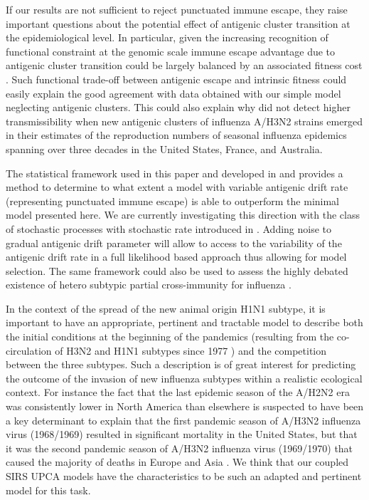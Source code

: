 If our results are not sufficient to reject punctuated immune escape,
they raise important questions about the potential effect of antigenic
cluster transition at the epidemiological level. In particular, given
the increasing recognition of functional constraint at the genomic
scale \citep{Rambaut2008, Du2008} immune escape advantage due to
antigenic cluster transition could be largely balanced by an
associated fitness cost \citep{Holmes2005}. Such functional trade-off
between antigenic escape and intrinsic fitness could easily explain
the good agreement with data obtained with our simple model neglecting
antigenic clusters.  This could also explain why \citet{Chowell2007a}
did not detect higher transmissibility when new antigenic clusters of
influenza A/H3N2 strains emerged in their estimates of the
reproduction numbers of seasonal influenza epidemics spanning over
three decades in the United States, France, and Australia.

The statistical framework used in this paper and developed in
\citet{Ionides2006} and \citet{Breto2009} provides a method to
determine to what extent a model with variable antigenic drift rate
(representing punctuated immune escape) is able to outperform the
minimal model presented here. We are currently investigating this
direction with the class of stochastic processes with stochastic rate
introduced in \citet{Breto2009}. Adding noise to gradual antigenic
drift parameter will allow to access to the variability of the
antigenic drift rate in a full likelihood based approach thus allowing
for model selection.  The same framework could also be used to assess
the highly debated existence of hetero subtypic partial cross-immunity
for influenza \citep{Epstein2006}.

In the context of the spread of the new animal origin H1N1 subtype, it
is important to have an appropriate, pertinent and tractable model to
describe both the initial conditions at the beginning of the pandemics
(resulting from the co-circulation of H3N2 and H1N1 subtypes since
1977 \citep{Earn2002}) and the competition between the three subtypes.
Such a description is of great interest for predicting the outcome of
the invasion of new influenza subtypes within a realistic ecological
context.  For instance the fact that the last epidemic season of the
A/H2N2 era was consistently lower in North America than elsewhere is
suspected to have been a key determinant to explain that the first
pandemic season of A/H3N2 influenza virus (1968/1969) resulted in
significant mortality in the United States, but that it was the second
pandemic season of A/H3N2 influenza virus (1969/1970) that caused the
majority of deaths in Europe and Asia \citep{Viboud2005}.  We think
that our coupled SIRS UPCA models have the characteristics to be such
an adapted and pertinent model for this task.

